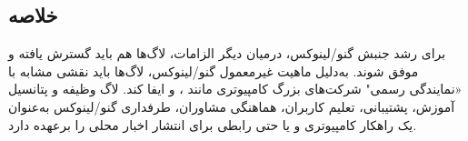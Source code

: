 \subsection{خلاصه}
برای رشد جنبش گنو/لینوکس، درمیان دیگر الزامات، لاگ‌ها هم باید گسترش یافته و موفق شوند.
به‌دلیل ماهیت غیرمعمول گنو/لینوکس، لاگ‌ها باید نقشی مشابه با «نمایندگی رسمی"
شرکت‌های بزرگ کامپیوتری مانند
،  و 
ایفا کند. لاگ وظیفه و پتانسیل آموزش، پشتیبانی، تعلیم کاربران، هماهنگی مشاوران،
طرفداری گنو/لینوکس به‌عنوان یک راهکار کامپیوتری و یا حتی رابطی برای انتشار اخبار محلی را برعهده دارد.

